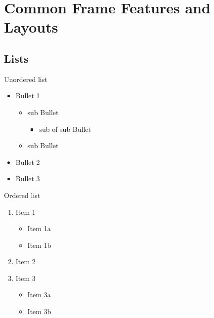 \documentclass[
  ignorenonframetext,
  aspectratio=169]{beamer}
\providecommand{\tightlist}{%
  \setlength{\itemsep}{0pt}\setlength{\parskip}{0pt}}
\begin{document}
\hypertarget{common-frame-features-and-layouts}{%
\section{Common Frame Features and
Layouts}\label{common-frame-features-and-layouts}}

\hypertarget{lists}{%
\subsection{Lists}\label{lists}}

\begin{frame}{Unordered list}
\protect\hypertarget{unordered-list}{}
\begin{itemize}
\tightlist
\item
  Bullet 1

  \begin{itemize}
  \tightlist
  \item
    sub Bullet

    \begin{itemize}
    \tightlist
    \item
      sub of sub Bullet
    \end{itemize}
  \item
    sub Bullet
  \end{itemize}
\item
  Bullet 2
\item
  Bullet 3
\end{itemize}
\end{frame}

\begin{frame}{Ordered list}
\protect\hypertarget{ordered-list}{}
\begin{enumerate}
\tightlist
\item
  Item 1

  \begin{itemize}
  \tightlist
  \item
    Item 1a
  \item
    Item 1b
  \end{itemize}
\item
  Item 2
\item
  Item 3

  \begin{itemize}
  \tightlist
  \item
    Item 3a
  \item
    Item 3b
  \end{itemize}
\end{enumerate}
\end{frame}
\end{document}
